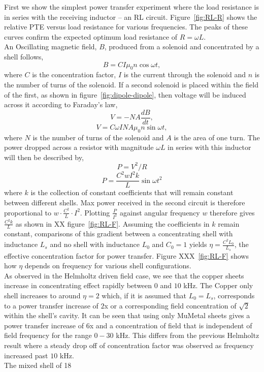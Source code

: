 \documentclass[11pt]{iopart}
\begin{document}
First we show the simplest power transfer experiment where the load
resistance is in series with the receiving inductor -- an RL
circuit. Figure~\ref{fig:RL-R} shows the relative PTE versus load
resistance for various frequencies. The peaks of these curves confirm
the expected optimum load resistance of $R = \omega L$. \\ An
Oscillating magnetic field, $B$, produced from a solenoid and
concentrated by a shell follows,
$$B = CI\mu_0n\cos{\omega t},$$
where $C$ is the concentration factor, $I$ is the current through the
solenoid and $n$ is the number of turns of the solenoid.  If a second
solenoid is placed within the field of the first, as shown in
figure~\ref{fig:dipole-dipole}, then voltage will be induced across it
according to Faraday's law,
$$V = -NA\frac{dB}{dt},$$
$$V = C\omega I NA\mu_0n\sin{\omega t},$$
where $N$ is the number of turns of the solenoid and $A$ is the area
of one turn.
The power dropped across a resistor with magnitude $\omega L$ in
series with this inductor will then be described by,
$$ P = V^2/R $$
$$ P = \frac{C^2wI^2k}{L}\sin{\omega t}^2$$
where $k$ is the collection of constant coefficients that will remain
constant between different shells.  Max power received in the second
circuit is therefore proportional to $w \cdot \frac{C^2}{L} \cdot
I^2$. Plotting $\frac{P}{I^2}$ against angular frequency $w$ therefore
gives $\frac{C^2k}{L}$ as shown in XX figure~\ref{fig:RL-F}. Assuming
the coefficients in $k$ remain constant, comparisons of this gradient
between a concentrating shell with inductance $L_s$ and no shell with
inductance $L_0$ and $C_0 = 1$ yields $\eta = \frac{C^2L_0}{L_s}$, the
effective concentration factor for power transfer. Figure
XXX~\ref{fig:RL-F} shows how $\eta$ depends on frequency for various
shell configurations.\\ As observed in the Helmholtz driven field
case, we see that the copper sheets increase in concentrating effect
rapidly between $0$ and $10$ kHz. The Copper only shell increases to
around $\eta = 2$ which, if it is assumed that $L_0 = L_s$,
corresponds to a power transfer increase of $2$x or a corresponding
field concentration of $\sqrt{2}$ within the shell's cavity. It can be
seen that using only MuMetal sheets gives a power transfer increase of
$6$x and a concentration of field that is independent of field
frequency for the range $0 - 30$ kHz. This differs from the previous
Helmholtz result where a steady drop off of concentration factor was
observed as frequency increased past $10$ kHz.\\ The mixed shell of 18
\end{document}
